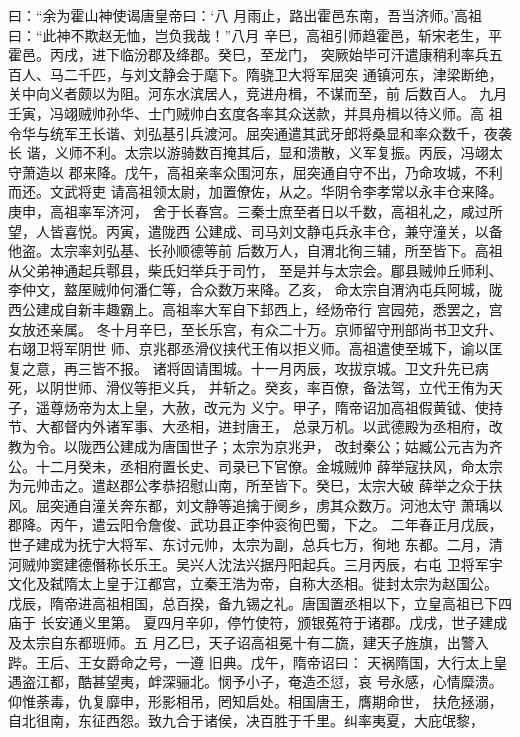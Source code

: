 \documentclass[12pt,UTF8]{ctexbook}
\begin{document}
曰：“余为霍山神使谒唐皇帝曰：‘八
月雨止，路出霍邑东南，吾当济师。’高祖曰：“此神不欺赵无恤，岂负我哉！”八月
辛巳，高祖引师趋霍邑，斩宋老生，平霍邑。丙戌，进下临汾郡及绛郡。癸巳，至龙门，
突厥始毕可汗遣康稍利率兵五百人、马二千匹，与刘文静会于麾下。隋骁卫大将军屈突
通镇河东，津梁断绝，关中向义者颇以为阻。河东水滨居人，竞进舟楫，不谋而至，前
后数百人。
九月壬寅，冯翊贼帅孙华、士门贼帅白玄度各率其众送款，并具舟楫以待义师。高
祖令华与统军王长谐、刘弘基引兵渡河。屈突通遣其武牙郎将桑显和率众数千，夜袭长
谐，义师不利。太宗以游骑数百掩其后，显和溃散，义军复振。丙辰，冯翊太守萧造以
郡来降。戊午，高祖亲率众围河东，屈突通自守不出，乃命攻城，不利而还。文武将吏
请高祖领太尉，加置僚佐，从之。华阴令李孝常以永丰仓来降。庚申，高祖率军济河，
舍于长春宫。三秦士庶至者日以千数，高祖礼之，咸过所望，人皆喜悦。丙寅，遣陇西
公建成、司马刘文静屯兵永丰仓，兼守潼关，以备他盗。太宗率刘弘基、长孙顺德等前
后数万人，自渭北徇三辅，所至皆下。高祖从父弟神通起兵鄠县，柴氏妇举兵于司竹，
至是并与太宗会。郿县贼帅丘师利、李仲文，盩厔贼帅何潘仁等，合众数万来降。乙亥，
命太宗自渭汭屯兵阿城，陇西公建成自新丰趣霸上。高祖率大军自下邽西上，经炀帝行
宫园苑，悉罢之，宫女放还亲属。
冬十月辛巳，至长乐宫，有众二十万。京师留守刑部尚书卫文升、右翊卫将军阴世
师、京兆郡丞滑仪挟代王侑以拒义师。高祖遣使至城下，谕以匡复之意，再三皆不报。
诸将固请围城。十一月丙辰，攻拔京城。卫文升先已病死，以阴世师、滑仪等拒义兵，
并斩之。癸亥，率百僚，备法驾，立代王侑为天子，遥尊炀帝为太上皇，大赦，改元为
义宁。甲子，隋帝诏加高祖假黄钺、使持节、大都督内外诸军事、大丞相，进封唐王，
总录万机。以武德殿为丞相府，改教为令。以陇西公建成为唐国世子；太宗为京兆尹，
改封秦公；姑臧公元吉为齐公。十二月癸未，丞相府置长史、司录已下官僚。金城贼帅
薛举寇扶风，命太宗为元帅击之。遣赵郡公孝恭招慰山南，所至皆下。癸巳，太宗大破
薛举之众于扶风。屈突通自潼关奔东都，刘文静等追擒于阌乡，虏其众数万。河池太守
萧瑀以郡降。丙午，遣云阳令詹俊、武功县正李仲衮徇巴蜀，下之。
二年春正月戊辰，世子建成为抚宁大将军、东讨元帅，太宗为副，总兵七万，徇地
东都。二月，清河贼帅窦建德僭称长乐王。吴兴人沈法兴据丹阳起兵。三月丙辰，右屯
卫将军宇文化及弑隋太上皇于江都宫，立秦王浩为帝，自称大丞相。徙封太宗为赵国公。
戊辰，隋帝进高祖相国，总百揆，备九锡之礼。唐国置丞相以下，立皇高祖已下四庙于
长安通义里第。
夏四月辛卯，停竹使符，颁银菟符于诸郡。戊戌，世子建成及太宗自东都班师。五
月乙巳，天子诏高祖冕十有二旒，建天子旌旗，出警入跸。王后、王女爵命之号，一遵
旧典。戊午，隋帝诏曰：
天祸隋国，大行太上皇遇盗江都，酷甚望夷，衅深骊北。悯予小子，奄造丕愆，哀
号永感，心情糜溃。仰惟荼毒，仇复靡申，形影相吊，罔知启处。相国唐王，膺期命世，
扶危拯溺，自北徂南，东征西怨。致九合于诸侯，决百胜于千里。纠率夷夏，大庇氓黎，
\end{document}
